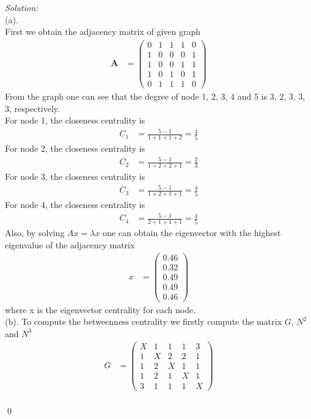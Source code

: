 \documentclass[12pt]{article}
\newenvironment{sol}
    {\emph{Solution:}
    }
    {
    \qed
    }
\begin{document}
	\begin{sol}\\
		(a). \\
		First we obtain the adjacency matrix of given graph 
		\begin{align*}
			\textbf{A} &= \begin{pmatrix}0 & 1 & 1 & 1 & 0 \\ 1 & 0 & 0 & 0 & 1 \\ 1 & 0 & 0 & 1 & 1 \\ 1 & 0 & 1 & 0 & 1 \\ 0 & 1 & 1 & 1 & 0\end{pmatrix}
		\end{align*}
		From the graph one can see that the degree of node 1, 2, 3, 4 and 5 is 3, 2, 3, 3, 3, respectively. \\
		For node 1, the closeness centrality is 
		\begin{align*}
			C_1 &= \frac{5-1}{1 + 1 + 1 + 2} = \frac{4}{5} 
		\end{align*}
		For node 2, the closeness centrality is
		\begin{align*}
			C_2 &= \frac{5-1}{1+2+2+1} = \frac{2}{3}
		\end{align*}
		For node 3, the closeness centrality is
		\begin{align*}
			C_3 &= \frac{5-1}{1+2+1+1} = \frac{4}{5}
		\end{align*}
		For node 4, the closeness centrality is
		\begin{align*}
			C_4 &= \frac{5-1}{2+1+1+1} = \frac{4}{5}
		\end{align*}
		Also, by solving $Ax = \lambda x$ one can obtain the eigenvector with the highest eigenvalue of the adjacency matrix
		\begin{align*}
			x &= \begin{pmatrix}0.46 \\ 0.32 \\ 0.49 \\ 0.49 \\ 0.46\end{pmatrix}
		\end{align*}
		where x is the eigenvector centrality for each node.\\
		(b). To compute the betweenness centrality we firstly compute the matrix $G$, $N^2$ and $N^3$
		\begin{align*}
			G &= \begin{pmatrix}X & 1 & 1 & 1 & 3 \\ 1 & X & 2 & 2 & 1 \\ 1 & 2 & X & 1 & 1 \\ 1 & 2 & 1 & X & 1 \\ 3 & 1 & 1 & 1 & X\end{pmatrix} \\

\end{align*}
\end{sol}
\end{document}

